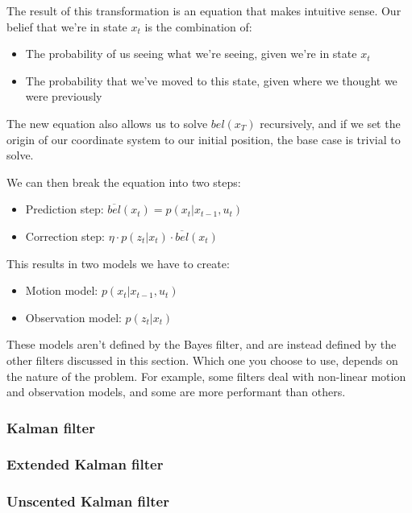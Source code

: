 \documentclass{article}
\begin{document}
The result of this transformation is an equation that makes intuitive sense.
Our belief that we're in state $x_t$ is the combination of:
\begin{itemize}
  \item The probability of us seeing what we're seeing, given we're in state
    $x_t$
  \item The probability that we've moved to this state, given where we thought
    we were previously
\end{itemize}

The new equation also allows us to solve $bel(x_T)$ recursively, and if we set
the origin of our coordinate system to our initial position, the base case is
trivial to solve.

We can then break the equation into two steps:
\begin{itemize}
  \item Prediction step:
    $\overline{bel}(x_t) = p(x_t \vert x_{t-1}, u_t)$
  \item Correction step:
    $\eta \cdot p(z_t \vert x_t) \cdot \overline{bel}(x_t)$
\end{itemize}
This results in two models we have to create:
\begin{itemize}
  \item Motion model: $p(x_t \vert x_{t-1}, u_t)$
  \item Observation model: $p(z_t \vert x_t)$
\end{itemize}

These models aren't defined by the Bayes filter, and are instead defined by the
other filters discussed in this section. Which one you choose to use, depends
on the nature of the problem. For example, some filters deal with non-linear
motion and observation models, and some are more performant than others.

\subsubsection{Kalman filter}

\subsubsection{Extended Kalman filter}

\subsubsection{Unscented Kalman filter}
\end{document}
